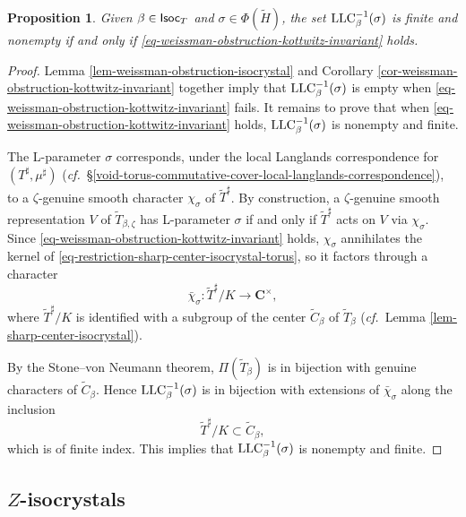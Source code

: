 \documentclass[10pt,english,reqno]{amsart}
\newcommand{\complexes}{\mathbf C}
\newcommand{\Isoc}{\textnormal{\textsf{Isoc}}}
\newcommand{\LLC}{\textnormal{LLC}}
\newtheorem{prop}[subsubsection]{Proposition}
\theoremstyle{definition}
\numberwithin{equation}{section}
\begin{document}
\begin{prop}
\label{prop-local-langlands-correspondence-tori}
Given $\beta \in \Isoc_T$ and $\sigma \in \Phi(\widetilde H)$, the set $\LLC_{\beta}^{-1}(\sigma)$ is finite and nonempty if and only if \eqref{eq-weissman-obstruction-kottwitz-invariant} holds.
\end{prop}
\begin{proof}
Lemma \ref{lem-weissman-obstruction-isocrystal} and Corollary \ref{cor-weissman-obstruction-kottwitz-invariant} together imply that $\LLC_{\beta}^{-1}(\sigma)$ is empty when \eqref{eq-weissman-obstruction-kottwitz-invariant} fails. It remains to prove that when \eqref{eq-weissman-obstruction-kottwitz-invariant} holds, $\LLC_{\beta}^{-1}(\sigma)$ is nonempty and finite.

The L-parameter $\sigma$ corresponds, under the local Langlands correspondence for $(T^{\sharp}, \mu^{\sharp})$ (\emph{cf.}~\S\ref{void-torus-commutative-cover-local-langlands-correspondence}), to a $\zeta$-genuine smooth character $\chi_{\sigma}$ of $\widetilde T^{\sharp}$. By construction, a $\zeta$-genuine smooth representation $V$ of $\widetilde T_{\beta, \zeta}$ has L-parameter $\sigma$ if and only if $\widetilde T^{\sharp}$ acts on $V$ via $\chi_{\sigma}$. Since \eqref{eq-weissman-obstruction-kottwitz-invariant} holds, $\chi_{\sigma}$ annihilates the kernel of \eqref{eq-restriction-sharp-center-isocrystal-torus}, so it factors through a character
$$
\bar{\chi}_{\sigma} : \widetilde T^{\sharp}/K \rightarrow \complexes^{\times},
$$
where $\widetilde T^{\sharp}/K$ is identified with a subgroup of the center $\widetilde C_{\beta}$ of $\widetilde T_{\beta}$ (\emph{cf.}~Lemma \ref{lem-sharp-center-isocrystal}).

By the Stone--von Neumann theorem, $\Pi(\widetilde T_{\beta})$ is in bijection with genuine characters of $\widetilde C_{\beta}$. Hence $\LLC_{\beta}^{-1}(\sigma)$ is in bijection with extensions of $\bar{\chi}_{\sigma}$ along the inclusion
$$
\widetilde T^{\sharp}/K \subset \widetilde C_{\beta},
$$
which is of finite index. This implies that $\LLC_{\beta}^{-1}(\sigma)$ is nonempty and finite.
\end{proof}



\subsection{$Z$-isocrystals}
\label{sec-center-isocrystal}
\end{document}
